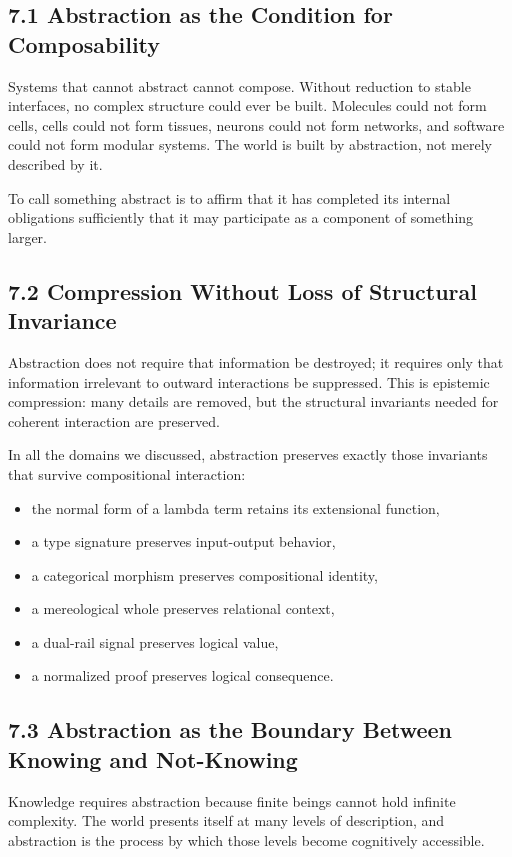 \documentclass[11pt,letterpaper]{article}
\begin{document}
\subsection{7.1 Abstraction as the Condition for Composability}

Systems that cannot abstract cannot compose. Without reduction to stable interfaces, no complex structure could ever be built. Molecules could not form cells, cells could not form tissues, neurons could not form networks, and software could not form modular systems. The world is built by abstraction, not merely described by it.

To call something abstract is to affirm that it has completed its internal obligations sufficiently that it may participate as a component of something larger.

\subsection{7.2 Compression Without Loss of Structural Invariance}

Abstraction does not require that information be destroyed; it requires only that information irrelevant to outward interactions be suppressed. This is epistemic compression: many details are removed, but the structural invariants needed for coherent interaction are preserved.

In all the domains we discussed, abstraction preserves exactly those invariants that survive compositional interaction:
\begin{itemize}
    \item the normal form of a lambda term retains its extensional function,
    \item a type signature preserves input-output behavior,
    \item a categorical morphism preserves compositional identity,
    \item a mereological whole preserves relational context,
    \item a dual-rail signal preserves logical value,
    \item a normalized proof preserves logical consequence.
\end{itemize}

\subsection{7.3 Abstraction as the Boundary Between Knowing and Not-Knowing}

Knowledge requires abstraction because finite beings cannot hold infinite complexity. The world presents itself at many levels of description, and abstraction is the process by which those levels become cognitively accessible.
\end{document}

